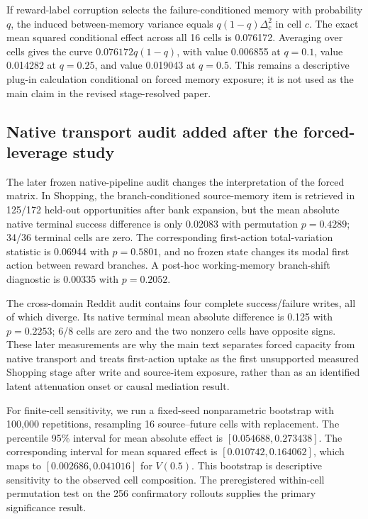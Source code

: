 If reward-label corruption selects the failure-conditioned memory with probability $q$, the induced between-memory variance equals $q(1-q)\Delta_c^2$ in cell $c$. The exact mean squared conditional effect across all 16 cells is 0.076172. Averaging over cells gives the curve $0.076172q(1-q)$, with value 0.006855 at $q=0.1$, value 0.014282 at $q=0.25$, and value 0.019043 at $q=0.5$. This remains a descriptive plug-in calculation conditional on forced memory exposure; it is not used as the main claim in the revised stage-resolved paper.

\subsection{Native transport audit added after the forced-leverage study}
The later frozen native-pipeline audit changes the interpretation of the forced matrix. In Shopping, the branch-conditioned source-memory item is retrieved in 125/172 held-out opportunities after bank expansion, but the mean absolute native terminal success difference is only 0.02083 with permutation $p=0.4289$; 34/36 terminal cells are zero. The corresponding first-action total-variation statistic is 0.06944 with $p=0.5801$, and no frozen state changes its modal first action between reward branches. A post-hoc working-memory branch-shift diagnostic is 0.00335 with $p=0.2052$.

The cross-domain Reddit audit contains four complete success/failure writes, all of which diverge. Its native terminal mean absolute difference is 0.125 with $p=0.2253$; 6/8 cells are zero and the two nonzero cells have opposite signs. These later measurements are why the main text separates forced capacity from native transport and treats first-action uptake as the first unsupported measured Shopping stage after write and source-item exposure, rather than as an identified latent attenuation onset or causal mediation result.

For finite-cell sensitivity, we run a fixed-seed nonparametric bootstrap with 100,000 repetitions, resampling 16 source--future cells with replacement. The percentile 95\% interval for mean absolute effect is $[0.054688,0.273438]$. The corresponding interval for mean squared effect is $[0.010742,0.164062]$, which maps to $[0.002686,0.041016]$ for $V(0.5)$. This bootstrap is descriptive sensitivity to the observed cell composition. The preregistered within-cell permutation test on the 256 confirmatory rollouts supplies the primary significance result.

